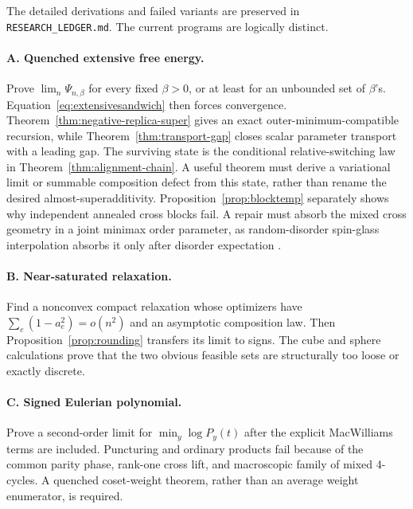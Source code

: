 \documentclass[11pt]{article}
\begin{document}
The detailed derivations and failed variants are preserved in
\texttt{RESEARCH\_LEDGER.md}.  The current programs are logically distinct.

\paragraph{A. Quenched extensive free energy.}
Prove \(\lim_n\Psi_{n,\beta}\) for every fixed \(\beta>0\), or at least for
an unbounded set of \(\beta\)'s.  Equation~\eqref{eq:extensivesandwich} then
forces convergence.  Theorem~\ref{thm:negative-replica-super} gives an exact
outer-minimum-compatible recursion, while
Theorem~\ref{thm:transport-gap} closes scalar parameter transport with a
leading gap.  The surviving state is the conditional relative-switching law
in Theorem~\ref{thm:alignment-chain}.  A useful theorem must derive a
variational limit or summable composition defect from this state, rather than
rename the desired almost-superadditivity.  Proposition~\ref{prop:blocktemp}
separately shows why independent annealed cross blocks fail.  A repair must
absorb the mixed cross geometry in a joint minimax order parameter, as
random-disorder spin-glass interpolation absorbs it only after disorder
expectation \cite{guerra-toninelli,auffinger-chen}.

\paragraph{B. Near-saturated relaxation.}
Find a nonconvex compact relaxation whose optimizers have
\(\sum_e(1-a_e^2)=o(n^2)\) and an asymptotic composition law.  Then
Proposition~\ref{prop:rounding} transfers its limit to signs.  The cube and
sphere calculations prove that the two obvious feasible sets are structurally
too loose or exactly discrete.

\paragraph{C. Signed Eulerian polynomial.}
Prove a second-order limit for
\(\min_y\log P_y(t)\) after the explicit MacWilliams terms are included.
Puncturing and ordinary products fail because of the common parity phase,
rank-one cross lift, and macroscopic family of mixed 4-cycles.  A quenched
coset-weight theorem, rather than an average weight enumerator, is required.
\end{document}
